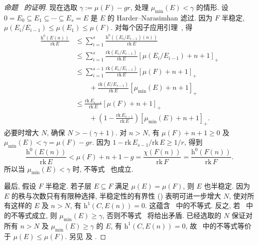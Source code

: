 \begin{proof}[命题~ 的证明]
现在选取 $\gamma:=\mu(F)-gr$, 处理 $\mu_{\min}(E)<\gamma$ 的情形. 设 $0=E_0\subseteq E_1\subseteq\cdots\subseteq E_s=E$ 是 $E$ 的 Harder--Narasimhan 滤过. 因为 $F$ 半稳定, $\mu(E_i/E_{i-1})\leq\mu(E_1)\leq\mu(F)$. 对每个因子应用引理~, 得
\[
\begin{aligned}
\frac{\mathrm h^0(E(n))}{\mathrm{rk}\,E}&\leq\sum_{i=1}^s\frac{\mathrm h^0((E_i/E_{i-1})(n))}{\mathrm{rk}\,E}\\
&\leq\sum_{i=1}^s\frac{\mathrm{rk}(E_i/E_{i-1})}{\mathrm{rk}\,E}[\mu(E_i/E_{i-1})+n+1]_+\\
&\leq\sum_{i=1}^{s-1}\frac{\mathrm{rk}(E_i/E_{i-1})}{\mathrm{rk}\,E}[\mu(F)+n+1]_+\\
&\qquad+\frac{\mathrm{rk}(E/E_{s-1})}{\mathrm{rk}\,E}[\mu_{\min}(E)+n+1]_+\\
&\leq\frac{\mathrm{rk}\,E_{s-1}}{\mathrm{rk}\,E}[\mu(F)+n+1]_+\\
&\qquad+\left(1-\frac{\mathrm{rk}\,E_{s-1}}{\mathrm{rk}\,E}\right)[\mu_{\min}(E)+n+1]_+.
\end{aligned}
\]
必要时增大 $N$, 确保 $N>-(\gamma+1)$. 对 $n>N$, 有 $\mu(F)+n+1\geq0$ 及 $\mu_{\min}(E)<\gamma=\mu(F)-gr$. 因为 $1-\mathrm{rk}\,E_{s-1}/\mathrm{rk}\,E\geq1/r$, 得到
\begin{equation}\label{src:9.5.11}
\frac{\mathrm h^0(E(n))}{\mathrm{rk}\,E}<\mu(F)+n+1-g=\frac{\chi(F(n))}{\mathrm{rk}\,F}=\frac{\mathrm h^0(F(n))}{\mathrm{rk}\,F}.
\end{equation}
所以当 $\mu_{\min}(E)<\gamma$ 时, 不等式~ 也成立.

最后, 假设 $F$ 半稳定. 若子层 $E\subseteq F$ 满足 $\mu(E)=\mu(F)$, 则 $E$ 也半稳定. 因为 $E$ 的秩与次数只有有限种选择, 半稳定性的有界性 () 表明可进一步增大 $N$, 使对所有这样的 $E$ 及 $n>N$, 有 $\mathrm h^1(C,E(n))=0$. 这蕴含~ 中的不等式. 反之, 若~ 中的不等式成立, 则 $\mu_{\min}(E)\geq\gamma$, 否则不等式~ 将给出矛盾. 已经选取的 $N$ 保证对所有 $n>N$ 及 $\mu_{\min}(E)\geq\gamma$ 的 $E$, 有 $\mathrm h^1(C,E(n))=0$, 故~ 中的不等式等价于 $\mu(E)\leq\mu(F)$. 另见 \cite[命题 7.1.1 和 7.1.3]{LP97} 及 \cite[定理 4.4.1]{HL10}.
\end{proof}
